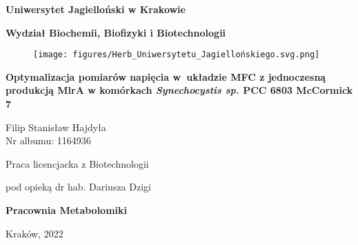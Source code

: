 \begin{titlepage}
    \thispagestyle{empty}
    \begin{center}
    
        \textbf{\large Uniwersytet Jagielloński w Krakowie}
        
        \vspace{0.5cm}
        
        \textbf{\Large Wydział Biochemii, Biofizyki i Biotechnologii}
        
        \vspace{0.5cm}
        
        \begin{figure}[h]
            \centering
            \texttt{[image: figures/Herb\_Uniwersytetu\_Jagiellońskiego.svg.png]}
            \label{fig:title}
        \end{figure}
        
        \vspace{0.5cm}

        \textbf{\huge Optymalizacja pomiarów napięcia w~układzie MFC z jednoczesną produkcją MlrA w komórkach \textit{Synechocystis sp.} PCC 6803 McCormick 7}

        \vspace{2cm}

        {\Large Filip Stanisław Hajdyła}\\
        Nr albumu: 1164936

        \vspace{2cm}
        
        {\large Praca licencjacka z Biotechnologii}
        
        \vspace{0.5cm}
        
        {\large pod opieką dr hab. Dariusza Dzigi}
        
        \vspace{1cm}
        
        \textbf{\Large Pracownia Metabolomiki}
        
        \vspace{2cm}
        
        Kraków, 2022
        
    \end{center}
\end{titlepage}